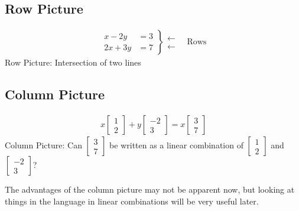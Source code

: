 \documentclass[11pt]{article}
\begin{document}
\begin{center}
\begin{minipage}[t]{.48\linewidth}
\subsection*{Row Picture}
\begin{align*}
\left.
\begin{aligned}
x - 2y &= 3
\\
2x + 3y &= 7
\end{aligned}
\right\}
\begin{aligned}
\longleftarrow
\\
\longleftarrow
\end{aligned}
\quad\text{Rows}
\end{align*}
Row Picture: Intersection of two lines
\end{minipage}
\begin{minipage}[t]{.48\linewidth}
\subsection*{Column Picture}
\begin{align*}
x
\begin{bmatrix}
1
\\
2
\end{bmatrix}
+
y
\begin{bmatrix}
-2
\\
3
\end{bmatrix}
=
x
\begin{bmatrix}
3
\\
7
\end{bmatrix}
\end{align*}
Column Picture: Can $\begin{bmatrix}3\\7\end{bmatrix}$ be written as a linear combination of $\begin{bmatrix}1\\2\end{bmatrix}$ and $\begin{bmatrix}-2\\3\end{bmatrix}$?
\end{minipage}
\end{center}

The advantages of the column picture may not be apparent now, but looking at things in the language in linear combinations will be very useful later.
\end{document}
